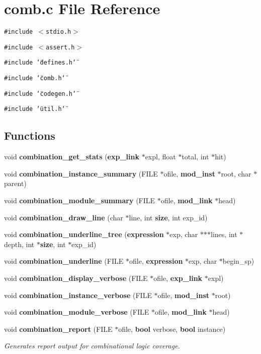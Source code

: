 \section{comb.c File Reference}
\label{comb_8c}
{\tt \#include $<$stdio.h$>$}\par
{\tt \#include $<$assert.h$>$}\par
{\tt \#include \char`\"{}defines.h\char`\"{}}\par
{\tt \#include \char`\"{}comb.h\char`\"{}}\par
{\tt \#include \char`\"{}codegen.h\char`\"{}}\par
{\tt \#include \char`\"{}util.h\char`\"{}}\par
\subsection*{Functions}
\begin{CompactItemize}
\item 
void {\bf combination\_\-get\_\-stats} ({\bf exp\_\-link} $\ast$expl, float $\ast$total, int $\ast$hit)
\item 
void {\bf combination\_\-instance\_\-summary} (FILE $\ast$ofile, {\bf mod\_\-inst} $\ast$root, char $\ast$parent)
\item 
void {\bf combination\_\-module\_\-summary} (FILE $\ast$ofile, {\bf mod\_\-link} $\ast$head)
\item 
void {\bf combination\_\-draw\_\-line} (char $\ast$line, int {\bf size}, int exp\_\-id)
\item 
void {\bf combination\_\-underline\_\-tree} ({\bf expression} $\ast$exp, char $\ast$$\ast$$\ast$lines, int $\ast$depth, int $\ast${\bf size}, int $\ast$exp\_\-id)
\item 
void {\bf combination\_\-underline} (FILE $\ast$ofile, {\bf expression} $\ast$exp, char $\ast$begin\_\-sp)
\item 
void {\bf combination\_\-display\_\-verbose} (FILE $\ast$ofile, {\bf exp\_\-link} $\ast$expl)
\item 
void {\bf combination\_\-instance\_\-verbose} (FILE $\ast$ofile, {\bf mod\_\-inst} $\ast$root)
\item 
void {\bf combination\_\-module\_\-verbose} (FILE $\ast$ofile, {\bf mod\_\-link} $\ast$head)
\item 
void {\bf combination\_\-report} (FILE $\ast$ofile, {\bf bool} verbose, {\bf bool} instance)
\begin{CompactList}\small\item\em Generates report output for combinational logic coverage.\item\end{CompactList}\end{CompactItemize}
